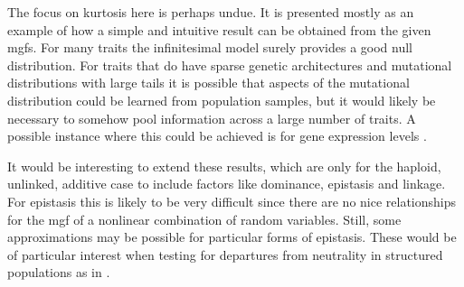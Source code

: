 \documentclass{article}
\begin{document}
The focus on kurtosis here is perhaps undue. It is presented mostly as an
example of how a simple and intuitive result can be obtained from the given
mgfs. For many traits the infinitesimal model surely provides a good null
distribution. For traits that do have sparse genetic architectures and
mutational distributions with large tails it is possible that aspects of the
mutational distribution could be learned from population samples, but it would
likely be necessary to somehow pool information across a large number of traits.
A possible instance where this could be achieved is for gene expression levels
\citep{Wheeler2016}.

It would be interesting to extend these results, which are only for the haploid,
unlinked, additive case to include factors like dominance, epistasis and
linkage. For epistasis this is likely to be very difficult since there are no
nice relationships for the mgf of a nonlinear combination of random variables.
Still, some approximations may be possible for particular forms of epistasis.
These would be of particular interest when testing for departures from
neutrality in structured populations as in \citet{Ovaskainen2011}.

 

\clearpage

\appendix
\end{document}
